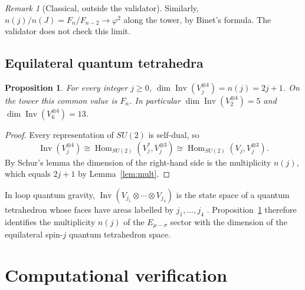 \documentclass[11pt]{amsart}
\newtheorem{proposition}[lemma]{Proposition}
\theoremstyle{definition}
\theoremstyle{remark}
\newtheorem{remark}[lemma]{Remark}
\newcommand{\Inv}{\operatorname{Inv}}
\begin{document}
\begin{remark}[Classical, outside the validator]\label{rem:phi2}
Similarly, $n(j)/n(J)=F_n/F_{n-2}\to\varphi^2$ along the tower, by Binet's formula. The validator does not check this limit.
\end{remark}

\subsection{Equilateral quantum tetrahedra}

\begin{proposition}\label{prop:tet}
For every integer $j\ge0$, $\dim\Inv(V_j^{\otimes4})=n(j)=2j+1$. On the tower this common value is $F_n$. In particular $\dim\Inv(V_2^{\otimes4})=5$ and $\dim\Inv(V_6^{\otimes4})=13$.
\end{proposition}
\begin{proof}
Every representation of $SU(2)$ is self-dual, so
\[
\Inv(V_j^{\otimes4})\cong\operatorname{Hom}_{SU(2)}(V_j^{*},V_j^{\otimes3})\cong\operatorname{Hom}_{SU(2)}(V_j,V_j^{\otimes3}).
\]
By Schur's lemma the dimension of the right-hand side is the multiplicity $n(j)$, which equals $2j+1$ by Lemma~\ref{lem:mult}.
\end{proof}

In loop quantum gravity, $\Inv(V_{j_1}\otimes\cdots\otimes V_{j_4})$ is the state space of a quantum tetrahedron whose faces have areas labelled by $j_1,\dots,j_4$ \cite{Barbieri,BaezBarrett}. Proposition~\ref{prop:tet} therefore identifies the multiplicity $n(j)$ of the $E_{\mu-\sigma}$ sector with the dimension of the equilateral spin-$j$ quantum tetrahedron space.

\section{Computational verification}\label{sec:comp}
\end{document}
